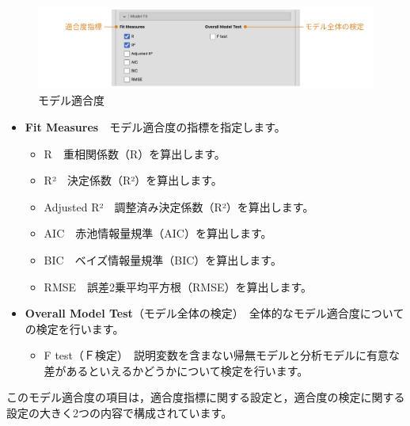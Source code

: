 \documentclass[
  12pt,
  a5jpaper,
  lualatex, ja=standard]{bxjsbook}
\providecommand{\tightlist}{%
  \setlength{\itemsep}{0pt}\setlength{\parskip}{0pt}}
\newenvironment{jmvsettings}{%
	\begin{center}%
	\begin{tcolorbox}[%
		title=設定項目,
		colframe=gmoji,
		colbacktitle=gmoji,
		colback=gmoji!2!white,
		breakable,
		width=.9\textwidth,
		]\small\addtolength{\leftmargini}{-3\labelsep}%
	}%
	{\end{tcolorbox}\end{center}}
\begin{document}
\begin{figure}[!ht]

{\centering \includegraphics[width=1\linewidth]{images/regression/lr-modelfit} 

}

\caption{モデル適合度}\label{fig:regression-lr-modelfit}
\end{figure}

\begin{jmvsettings}

\begin{itemize}
\tightlist
\item
  \textbf{Fit Measures}　モデル適合度の指標を指定します。

  \begin{itemize}
  \tightlist
  \item
    R　重相関係数（R）を算出します。
  \item
    R²　決定係数（R²）を算出します。
  \item
    Adjusted R²　調整済み決定係数（R²）を算出します。
  \item
    AIC　赤池情報量規準（AIC）を算出します。
  \item
    BIC　ベイズ情報量規準（BIC）を算出します。
  \item
    RMSE　誤差2乗平均平方根（RMSE）を算出します。
  \end{itemize}
\item
  \textbf{Overall Model Test}（モデル全体の検定）　全体的なモデル適合度についての検定を行います。

  \begin{itemize}
  \tightlist
  \item
    F test（Ｆ検定）　説明変数を含まない帰無モデルと分析モデルに有意な差があるといえるかどうかについて検定を行います。
  \end{itemize}
\end{itemize}

\end{jmvsettings}

このモデル適合度の項目は，適合度指標に関する設定と，適合度の検定に関する設定の大きく2つの内容で構成されています。
\end{document}
